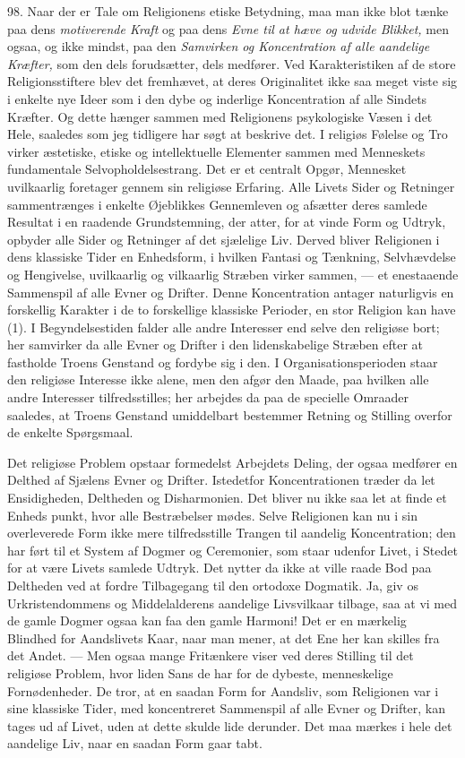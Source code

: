 \documentclass[12pt,a4paper,openany]{book}
\newcommand{\opage}[1]{\marginnote{\footnotesize\textit{[#1]}}}
\begin{document}
98. Naar der er Tale om Religionens etiske Betydning, maa man ikke blot
tænke paa dens \textit{motiverende Kraft} og paa dens \textit{Evne til
at hæve og udvide Blikket,} men ogsaa, og ikke mindst, paa den
\textit{Samvirken og Koncentration af alle aandelige Kræfter,} som den
dels forudsætter, dels medfører. Ved Karakteristiken af de store
Religionsstiftere blev det fremhævet, at deres Originalitet ikke saa
meget viste sig i enkelte nye Ideer som i den dybe og inderlige
Koncentration af alle Sindets Kræfter. Og dette hænger sammen med
Religionens psykologiske Væsen i det Hele, saaledes som jeg tidligere
har søgt at beskrive det. I religiøs Følelse og Tro virker æstetiske,
etiske og intellektuelle Elementer sammen med Menneskets fundamentale
Selvopholdelsestrang. Det er et centralt Opgør, Mennesket uvilkaarlig
foretager gennem sin religiøse Erfaring. Alle Livets Sider og Retninger
sammentrænges i enkelte Øjeblikkes Gennemleven og afsætter deres samlede
Resultat i en raadende Grundstemning, der atter, for at vinde Form og
Udtryk, opbyder alle Sider og Retninger af det sjælelige Liv. Derved
bliver Religionen i dens klassiske Tider en Enhedsform, i hvilken
Fantasi og Tænkning, Selvhævdelse og Hengivelse, uvilkaarlig og
vilkaarlig Stræben virker sammen, --- et enestaaende Sammenspil af alle
Evner og Drifter. Denne Koncentration antager naturligvis en forskellig
Karakter i de to forskellige klassiske Perioder, en stor Religion kan
have (1). I Begyndelsestiden falder alle andre Interesser end selve den
religiøse bort; her samvirker da alle Evner og Drifter i den
lidenskabelige Stræben efter at fastholde Troens Genstand og fordybe sig
i den. I Organisationsperioden staar den religiøse Interesse ikke alene,
men den afgør den Maade, paa hvilken alle andre Interesser
tilfredsstilles; her arbejdes da paa de specielle Omraader saaledes, at
Troens Genstand umiddelbart bestemmer Retning og Stilling overfor de
enkelte Spørgsmaal.

Det religiøse Problem opstaar formedelst Arbejdets Deling, der ogsaa
medfører en Delthed af Sjælens Evner og Drifter. Istedetfor
Koncentrationen træder da let Ensidigheden, Deltheden og Disharmonien.
Det bliver nu ikke saa let at finde et Enheds%
\opage{224}punkt, hvor alle Bestræbelser mødes. Selve Religionen kan nu
i sin overleverede Form ikke mere tilfredsstille Trangen til aandelig
Koncentration; den har ført til et System af Dogmer og Ceremonier, som
staar udenfor Livet, i Stedet for at være Livets samlede Udtryk. Det
nytter da ikke at ville raade Bod paa Deltheden ved at fordre
Tilbagegang til den ortodoxe Dogmatik. Ja, giv os Urkristendommens og
Middelalderens aandelige Livsvilkaar tilbage, saa at vi med de gamle
Dogmer ogsaa kan faa den gamle Harmoni! Det er en mærkelig Blindhed for
Aandslivets Kaar, naar man mener, at det Ene her kan skilles fra det
Andet. --- Men ogsaa mange Fritænkere viser ved deres Stilling til det
religiøse Problem, hvor liden Sans de har for de dybeste, menneskelige
Fornødenheder. De tror, at en saadan Form for Aandsliv, som Religionen
var i sine klassiske Tider, med koncentreret Sammenspil af alle Evner og
Drifter, kan tages ud af Livet, uden at dette skulde lide derunder. Det
maa mærkes i hele det aandelige Liv, naar en saadan Form gaar tabt.
\end{document}
